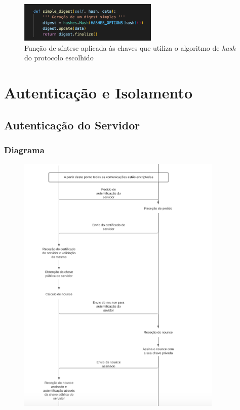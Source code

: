 \documentclass[10pt,english]{article}
\begin{document}
\begin{itemize}
\begin{figure}[!h]
        \centering
        \includegraphics[width=250]{images/simple_digest.png}
        \caption{Função de síntese aplicada às chaves que utiliza o algoritmo de \textit{hash} do protocolo escolhido}
\end{figure}

\end{itemize}

\clearpage

\section{Autenticação e Isolamento}

\subsection{Autenticação do Servidor}

\subsubsection{Diagrama}
    \begin{figure}[!h]
            \centering
            \includegraphics[width=370]{images/4.png}
    \end{figure}
\end{document}
